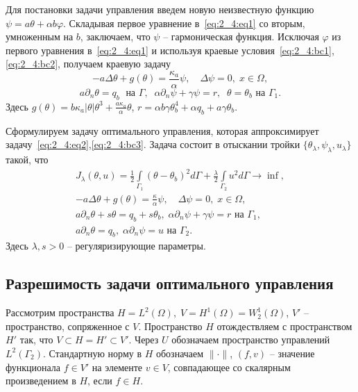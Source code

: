 Для постановки задачи управления введем новую неизвестную функцию
$\psi= a\theta + \alpha b \varphi$.
Складывая первое уравнение в~\eqref{eq:2_4:eq1} со вторым, умноженным на $b$,
заключаем, что $\psi$ -- гармоническая функция.
Исключая $\varphi$ из первого уравнения в~\eqref{eq:2_4:eq1} и используя краевые
условия~\eqref{eq:2_4:bc1},\eqref{eq:2_4:bc2},
получаем краевую задачу
\begin{equation}
    \label{eq:2_4:eq2}
    - a \Delta \theta + g (\theta) = \frac{\kappa_a}{\alpha}\psi, \quad
    \Delta \psi = 0, \; x \in \Omega,
\end{equation}
\begin{equation}
    \label{eq:2_4:bc3}
    a \partial_n \theta = q_b \; \text{ на }\Gamma, \;\;
    \alpha \partial_n \psi + \gamma \psi  =  r,\;\;
    \theta = \theta_b  \text{ на }\Gamma_1.
\end{equation}
Здесь $g(\theta) = b \kappa_a|\theta|\theta^3 + \frac{a\kappa_a}{\alpha}\theta$, $r=\alpha b \gamma \theta_b^4+ \alpha q_b + a \gamma \theta_b$.

Сформулируем задачу оптимального управления, которая аппроксимирует
задачу~\eqref{eq:2_4:eq2},\eqref{eq:2_4:bc3}.
Задача состоит в отыскании тройки $\{\theta_\lambda,\psi_\lambda,u_\lambda\}$ такой, что
\begin{gather}
    \label{eq:2_4:cost}
    J_\lambda(\theta, u) =
    \frac{1}{2} \int \limits_{\Gamma_1} (\theta - \theta_b)^2 d \Gamma
    + \frac{\lambda}{2}\int\limits_{\Gamma_2} u^2 d\Gamma \rightarrow \inf, \\
    - a \Delta \theta + g (\theta) = \frac{\kappa}{\alpha}\psi, \quad
    \Delta \psi = 0, \; x \in \Omega, \\
    a \partial_n \theta + s \theta = q_b + s \theta_b,
    \; \alpha \partial_n \psi + \gamma \psi = r
    \text{ на } \Gamma_1,\\
    a \partial_n \theta = q_b, \;
    \alpha \partial_n \psi = u \text{ на } \Gamma_2.
\end{gather}
Здесь $\lambda, s > 0$ -- регуляризирующие параметры.

\subsection{Разрешимость задачи оптимального управления}
\label{subsec:ch2/sec4/solvability}
Рассмотрим пространства $H = L^2(\Omega), \; V = H^1(\Omega)=W^1_2(\Omega)$, $V'$
-- пространство, сопряженное с $V$.
Пространство $H$ отождествляем с пространством $H'$ так, что $V \subset H = H' \subset V'$.
Через $U$ обозначаем пространство управлений $L^2(\Gamma_2)$.
Стандартную норму в $H$ обозначаем $\|\cdot\|$,
$(f,v)$ -- значение функционала $f\in V'$ на элементе $v\in V$,
совпадающее со скалярным произведением в $H$, если $f\in H$.


